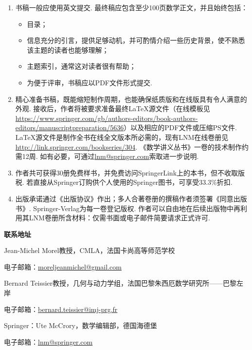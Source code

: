 \begin{enumerate}
\item 书稿一般应使用英文提交. 最终稿应包含至少100页数学正文，并且始终包括：
\begin{itemize}
\item 目录；
\item 信息充分的引言，提供足够动机，并可酌情介绍一些历史背景，使不熟悉该主题的读者也能够理解；
\item 主题索引，通常这对读者很有帮助；
\item 为便于评审，书稿应以PDF文件形式提交.
\end{itemize}

\item 精心准备书稿，既能缩短制作周期，也能确保纸质版和在线版具有令人满意的外观. 接收后，作者将被要求准备最终LaTeX源文件（在线模板见\url{https://www.springer.com/gb/authors-editors/book-authors-editors/manuscriptpreparation/5636}）以及相应的PDF文件或压缩PS文件. LaTeX源文件是制作全书在线全文版本所必需的，现有LNM在线卷册见\url{http://link.springer.com/bookseries/304}. 《数学讲义丛书》一卷的技术制作约需12周. 如有必要，可通过\href{mailto:lnm@springer.com}{lnm@springer.com}索取进一步说明.

\item 作者共可获得30册免费样书，并免费访问SpringerLink上的本书，但不收取版税. 若直接从Springer订购供个人使用的Springer图书，可享受33.3\%折扣.

\item 出版承诺通过《出版协议》作出；多人合著卷册的撰稿作者须签署《同意出版书》. Springer-Verlag为每一卷登记版权. 作者可以自由地在后续出版物中再利用其LNM卷册所含材料：仅需书面或电子邮件简要请求正式许可.
\end{enumerate}

\noindent\textbf{联系地址}

\noindent Jean-Michel Morel教授，CMLA，法国卡尚高等师范学校\par
电子邮箱：\href{mailto:moreljeanmichel@gmail.com}{moreljeanmichel@gmail.com}

\noindent Bernard Teissier教授，几何与动力学组，法国巴黎朱西厄数学研究所——巴黎左岸\par
电子邮箱：\href{mailto:bernard.teissier@imj-prg.fr}{bernard.teissier@imj-prg.fr}

\noindent Springer：Ute McCrory，数学编辑部，德国海德堡\par
电子邮箱：\href{mailto:lnm@springer.com}{lnm@springer.com}
